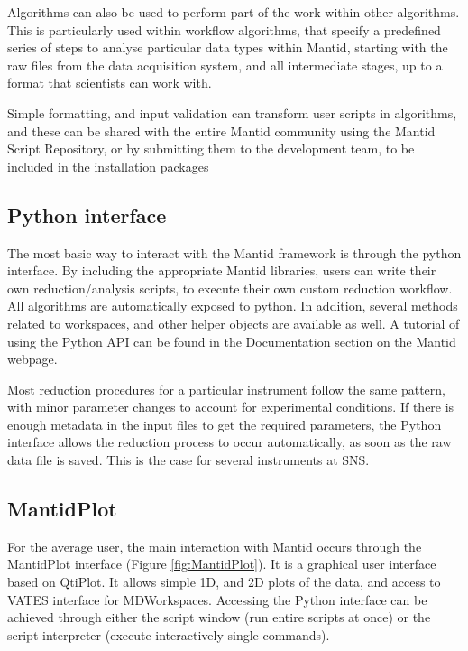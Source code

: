 \documentclass{elsarticle}
\begin{document}
Algorithms can also be used to perform part of the work within other algorithms. This is particularly used within workflow algorithms, that specify a predefined series of steps to analyse particular data types within Mantid, starting with the raw files from the data acquisition system, and all intermediate stages, up to a format that scientists can work with.

Simple formatting, and input validation can transform user scripts in algorithms, and these can be shared with the entire Mantid community using the Mantid Script Repository, or by submitting them to the development team, to be included in the installation packages


\subsection{Python interface}
The most basic way to interact with the Mantid framework is through the python interface. By including the appropriate Mantid libraries, users can write their own reduction/analysis scripts, to execute their own custom reduction workflow. All algorithms are automatically exposed to python. In addition, several methods related to workspaces, and other helper objects are available as well. A tutorial of using the Python API can be found in the Documentation section on the Mantid webpage\cite{webpage}.  

Most reduction procedures for a particular instrument follow the same pattern, with minor parameter changes to account for experimental conditions. If there is enough metadata in the input files to get the required parameters, the Python interface allows the reduction process to occur automatically, as soon as the raw data file is saved. This is the case for several instruments at SNS. 

\subsection{MantidPlot}
For the average user, the main interaction with Mantid occurs through the MantidPlot interface (Figure \ref{fig:MantidPlot}). It is a graphical user interface based on QtiPlot\cite{qtiplot}. It allows simple 1D, and 2D plots of the data, and access to VATES interface for MDWorkspaces. Accessing the Python interface can be achieved through either the script window (run entire scripts at once) or the script interpreter (execute interactively single commands).
\end{document}
